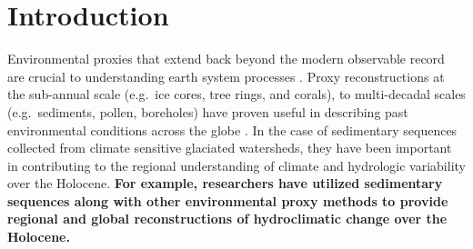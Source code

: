 \documentclass[Royal,times,doublespace,sageh]{sagej}
\begin{document}

\maketitle

\hypertarget{introduction}{%
\section{Introduction}\label{introduction}}

Environmental proxies that extend back beyond the modern observable
record are crucial to understanding earth system processes
\citep{Turney2019, Huber2012, Nelson2016}. Proxy reconstructions at the
sub-annual scale (e.g.~ice cores, tree rings, and corals), to
multi-decadal scales (e.g.~sediments, pollen, boreholes) have proven
useful in describing past environmental conditions across the globe
\citep{Masson2013}. In the case of sedimentary sequences collected from
climate sensitive glaciated watersheds, they have been important in
contributing to the regional understanding of climate and hydrologic
variability over the Holocene. \textbf{For example, researchers have
utilized sedimentary sequences along with other environmental proxy
methods to provide regional \citep{Menounos2009b} and global
\citep{Neukom2019} reconstructions of hydroclimatic change over the
Holocene.}
\end{document}
